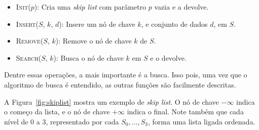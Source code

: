 \documentclass[paper=a4, fontsize=11pt]{scrartcl} %
\numberwithin{equation}{section}
\numberwithin{figure}{section}
\numberwithin{table}{section}
\numberwithin{definition}{section}
\numberwithin{theorem}{section}
\numberwithin{property}{section}
\numberwithin{proposition}{section}
\newcommand{\skl}{\textit{skip list}\xspace}
\begin{document}
\begin{itemize}
  \item \textsc{Init}($p$): Cria uma \skl com parâmetro $p$ vazia e a devolve.
  \item \textsc{Insert}($S$, $k$, $d$): Insere um nó de chave $k$, e conjunto de dados
                                                 $d$, em $S$.
  \item \textsc{Remove}($S$, $k$): Remove o nó de chave $k$ de $S$.
  \item \textsc{Search}($S$, $k$): Busca o nó de chave $k$ em $S$ e o devolve.
\end{itemize}

Dentre essas operações, a mais importante é a busca. Isso pois, uma vez que o algoritmo de busca é entendido,
as outras funções são facilmente descritas.


A Figura~\ref{fig:skiplist} mostra um exemplo de \skl. 
O nó de chave $-\infty$ indica o começo da lista, e o nó de chave $+\infty$ indica o final.
Note também que cada nível de 0 a 3, representado por cada $S_0, \ldots, S_3$, forma uma lista ligada ordenada.
\end{document}
